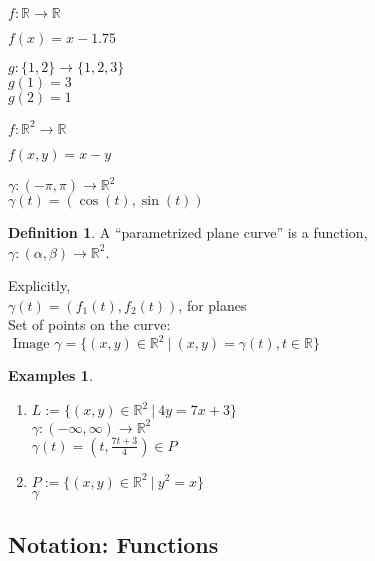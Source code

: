 \documentclass[twocolumn,20pt,fleqn]{extarticle}
\newcommand{\sep}{\vspace{0.5cm}}
\theoremstyle{plain}
\theoremstyle{definition}
\newtheorem*{definition}{Definition}
\newtheorem*{exmpls}{Examples}
\theoremstyle{remark}
\newenvironment*{examples}{\begin{exmpls} ~ \begin{enumerate}}{\end{enumerate}\end{exmpls}}
\begin{document}
$ f: \mathbb{R}  \to \mathbb{R}$

$f(x) = x - 1.75$\\

\sep

  $g : \{1,2\} \to \{1,2,3\}$\\
    $g(1) = 3$\\
    $g(2) = 1$\\

\sep

$ f: \mathbb{R}^2  \to \mathbb{R}$

$f(  x,y  ) = x - y$


\sep

$\gamma :  (-\pi,\pi)  \to \mathbb{R}^2$\\
$\gamma(t) = (\cos(t), \sin(t))$



\newpage



\begin{definition}
  A  ``parametrized plane curve''  is a  function,\\ $\gamma  : (\alpha, \beta) \to \mathbb{R}^2$.
\end{definition}

Explicitly,\\
$\gamma(t) = (f_1(t), f_2(t))$, for planes\\

Set of points on the curve:\\  $\textrm{ Image } \gamma = \{(x,y) \in \mathbb{R}^2 \ |\ (x,y) = \gamma(t), t \in \mathbb{R}\}$




\begin{examples}
  \item $L:=\{(x,y) \in \mathbb{R}^2\ |\ 4y = 7x + 3\}$\\
  $\gamma  : (-\infty,\infty) \to \mathbb{R}^2$ \\
  $\gamma(t) = (t, \frac{7t+3}{4})  \in P$\\
  \item $P:=\{(x,y) \in \mathbb{R}^2\ |\ y^2 = x\}$\\
  $\gamma $\end{examples}


\clearpage




\subsection{Notation: Functions}
\end{document}
